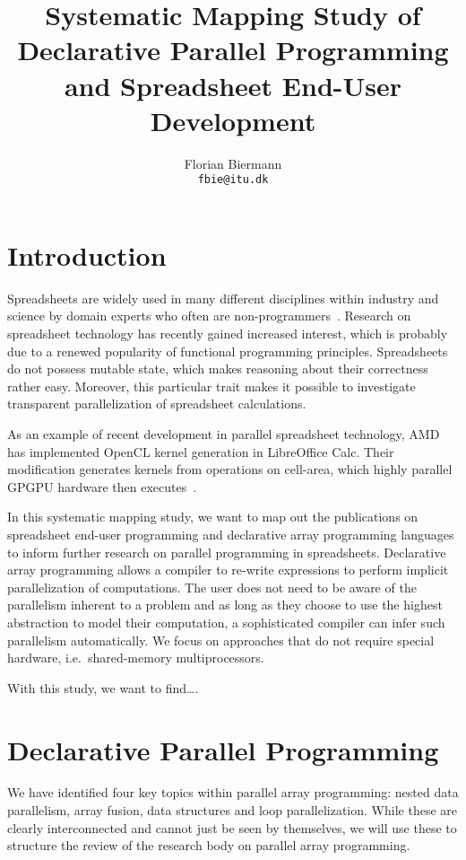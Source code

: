 \documentclass[a4paper]{article}
\title{Systematic Mapping Study of Declarative Parallel Programming
  and Spreadsheet End-User Development}
\author{Florian Biermann\\\small{\texttt{fbie@itu.dk}}}
\begin{document}
\maketitle

\section{Introduction}
\label{sec:intro}

Spreadsheets are widely used in many different disciplines within
industry and science by domain experts who often are
non-programmers~\cite{Sestoft2014Spreadsheet}. Research on spreadsheet
technology has recently gained increased interest, which is probably
due to a renewed popularity of functional programming
principles. Spreadsheets do not possess mutable state, which makes
reasoning about their correctness rather easy. Moreover, this
particular trait makes it possible to investigate transparent
parallelization of spreadsheet calculations.

As an example of recent development in parallel spreadsheet
technology, AMD has implemented OpenCL kernel generation in
LibreOffice Calc. Their modification generates kernels from operations
on cell-area, which highly parallel GPGPU hardware then
executes~\cite{Trudeau2015Collaboration}.

In this systematic mapping study, we want to map out the publications
on spreadsheet end-user programming and declarative array programming
languages to inform further research on parallel programming in
spreadsheets. Declarative array programming allows a compiler to
re-write expressions to perform implicit parallelization of
computations. The user does not need to be aware of the parallelism
inherent to a problem and as long as they choose to use the highest
abstraction to model their computation, a sophisticated compiler can
infer such parallelism automatically. We focus on approaches that do
not require special hardware, i.e.\ shared-memory multiprocessors.

With this study, we want to find\dots.

\section{Declarative Parallel Programming}
\label{sec:declarative-parallel-programming}

We have identified four key topics within parallel array programming:
nested data parallelism, array fusion, data structures and loop
parallelization. While these are clearly interconnected and cannot
just be seen by themselves, we will use these to structure the review
of the research body on parallel array programming.
\end{document}
